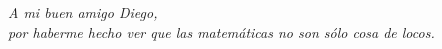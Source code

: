 
\thispagestyle{empty}
{}

\hfill
\vfill

\begin{flushright}
\itshape
A mi buen amigo Diego, \\
por haberme hecho ver que las matemáticas 
no son sólo cosa de locos.
\end{flushright}

\vfill

\cleardoublepage
\endinput

